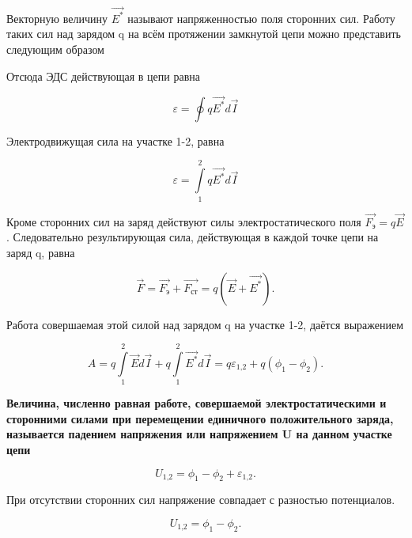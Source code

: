 \documentclass[14pt, a4paper, twoside]{extreport}
\begin{document}
Векторную величину $\vec{E^\text{*}}$ называют напряженностью  поля сторонних сил. Работу таких сил над зарядом q на всём протяжении замкнутой цепи можно представить следующим образом

Отсюда ЭДС действующая в цепи равна

\begin{equation}
  \label{eq:curcuitElctricForce}
  \varepsilon= \oint{q\vec{E^\text{*}}d\vec{I}}
\end{equation}

Электродвижущая сила на участке 1-2, равна

\begin{equation}
  \label{eq:curcuitPartElctricForce}
  \varepsilon= \int\limits_{1}^{2}{q\vec{E^\text{*}}d\vec{I}}
\end{equation}

Кроме сторонних сил на заряд действуют силы электростатического поля $\vec{F_\text{э}}=q\vec{E}$. Следовательно результирующая сила, действующая в каждой точке цепи на заряд q, равна

\begin{equation}
  \label{eq:resForce}
  \vec{F} = \vec{F_\text{э}} + \vec{F_\text{ст}} = q(\vec{E} + \vec{E^\text{*}}).
\end{equation}

Работа совершаемая этой силой над зарядом q на участке 1-2, даётся выражением

\begin{equation}
  \label{eq:resWork}
  A = q\int\limits_{1}^{2}\vec{E}d\vec{I} +  q\int\limits_{1}^{2}\vec{E^\text{*}}d\vec{I} = q\varepsilon_\text{1,2} + q(\phi_1 - \phi_2).
\end{equation}

\textbf{Величина, численно равная работе, совершаемой электростатическими и сторонними силами при перемещении единичного положительного заряда, называется падением напряжения или напряжением U на данном участке цепи}

\begin{equation}
  \label{eq:voltage}
  U_\text{1,2} = \phi_1 - \phi_2 + \varepsilon_\text{1,2}.
\end{equation}

При отсутствии сторонних сил напряжение совпадает с разностью потенциалов.

\begin{equation}
  \label{eq:voltageWithoutSideForce}
  U_\text{1,2} = \phi_1 - \phi_2.
\end{equation}
\end{document}
